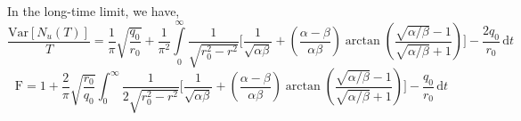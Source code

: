 \documentclass[journal]{IEEEtran}
\theoremstyle{plain}
\theoremstyle{definition}
\theoremstyle{remark}
\newcommand{\FF}{\mathrm{F}}
\newcommand{\Nu}{N_u(T)}
\newcommand{\dd}{\mathrm{d}}
\newcommand{\Var}{\text{Var}}
\begin{document}
In the long-time limit, we have,
\begin{equation}
    \frac{\Var\left[\Nu\right]}{T} =\frac{1}{\pi}\sqrt{\frac{q_0}{r_0}} + \frac{1}{\pi^2} \int\limits_{0}^\infty  \frac{1}{\sqrt{r_0^2-r^2}}\Biggl[\frac{1}{\sqrt{\alpha\beta}} + \left(\frac{\alpha - \beta}{\alpha\beta}\right) \arctan\left(\frac{\sqrt{\alpha/\beta}-1}{\sqrt{\alpha/\beta}+1}\right)\Biggr] - \frac{2q_0}{r_0} \, \dd t
\end{equation}
\begin{equation}
    \FF = 1 +\frac{2}{\pi} \sqrt{\frac{r_0}{q_0}} \int_{0}^\infty   \frac{1}{2\sqrt{r_0^2-r^2}}\Biggl[\frac{1}{\sqrt{\alpha\beta}} + \left(\frac{\alpha - \beta}{\alpha\beta}\right) \arctan\left(\frac{\sqrt{\alpha/\beta}-1}{\sqrt{\alpha/\beta}+1}\right)\Biggr] - \frac{q_0}{r_0}\,  \dd t
\end{equation}
\end{document}

